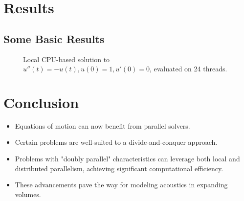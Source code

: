 \section*{Results}
\subsection*{Some Basic Results}
\begin{figure}[h!]
    \centering
    \caption{Local CPU-based solution to $u''(t) = -u(t), u(0) = 1, u'(0) = 0$, evaluated on 24 threads.}
\end{figure}

\section*{Conclusion}
\begin{itemize}
    \item Equations of motion can now benefit from parallel solvers.
    \item Certain problems are well-suited to a divide-and-conquer approach.
    \item Problems with "doubly parallel" characteristics can leverage both local and distributed parallelism, achieving significant computational efficiency.
    \item These advancements pave the way for modeling acoustics in expanding volumes.
\end{itemize}


